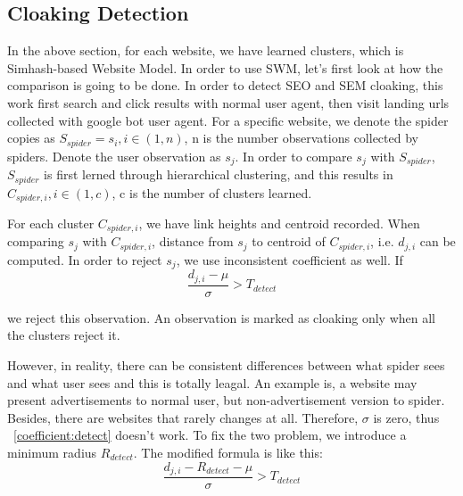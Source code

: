 \subsection{Cloaking Detection}
In the above section, for each website, we have learned clusters, which is
Simhash-based Website Model. In order to use SWM, let's first look at how the
comparison is going to be done. In order to detect SEO and SEM cloaking,
this work first search and click results with normal user agent, then visit 
landing urls collected with google bot user agent.
For a specific website, we denote the spider copies as $S_{spider} = s_{i}, i \in
(1,n)$, n is the number observations collected by spiders.
Denote the user observation as $s_{j}$. In order to
compare $s_{j}$ with $S_{spider}$, $S_{spider}$ is first lerned through
hierarchical clustering, and this results in $C_{spider, i}, i \in (1,c)$, c is
the number of clusters learned.

For each cluster $C_{spider, i}$, we have link heights and centroid recorded.
When comparing $s_{j}$ with $C_{spider, i}$, distance from $s_{j}$ to centroid
of $C_{spider, i}$, i.e. $d_{j,i}$ can be computed.
In order to reject $s_{j}$, we use inconsistent coefficient as well. If
\begin{equation}
  \label{coefficient:detect}
  \frac{d_{j,i} - \mu}{\sigma} > T_{detect}
\end{equation}

we reject this observation.
An observation is marked as cloaking only when all the clusters reject it.

However, in reality, there can be consistent differences between what spider
sees and what user sees and this is totally leagal. An example is, a website may
present advertisements to normal user, but non-advertisement version to spider.
Besides, there are websites that rarely changes at all. Therefore, $\sigma$ is
zero, thus ~\autoref{coefficient:detect} doesn't work. To fix the two problem, we introduce
a minimum radius $R_{detect}$. The modified formula is like this:
\begin{equation}
  \label{radius:detect}
  \frac{d_{j,i} - R_{detect} - \mu}{\sigma} > T_{detect}
\end{equation}



